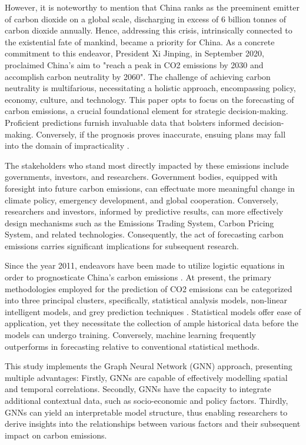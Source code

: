 \documentclass[sigconf, authordraft]{acmart}
\begin{document}
However, it is noteworthy to mention that China ranks as the preeminent
emitter of carbon dioxide on a global scale, discharging in excess of 6 billion
tonnes of carbon dioxide annually. Hence, addressing this crisis,
intrinsically connected to the existential fate of mankind, became a priority for
China. As a concrete commitment to this endeavor, President Xi Jinping, in
September 2020, proclaimed China's aim to "reach a peak in CO2 emissions by
2030 and accomplish carbon neutrality by 2060". The challenge of achieving
carbon neutrality is multifarious, necessitating a holistic approach,
encompassing policy, economy, culture, and technology. This paper opts to
focus on the forecasting of carbon emissions, a crucial foundational element for
strategic decision-making. Proficient predictions furnish invaluable data that
bolsters informed decision-making. Conversely, if the prognosis proves
inaccurate, ensuing plans may fall into the domain of impracticality \cite{-forecasting}.

The stakeholders who stand most directly impacted by these emissions include governments,
investors, and researchers. Government bodies, equipped with foresight into future
carbon emissions, can effectuate more meaningful change in climate policy, emergency
development, and global cooperation. Conversely, researchers and investors, informed
by predictive results, can more effectively design mechanisms such as the
Emissions Trading System, Carbon Pricing System, and related technologies. Consequently,
the act of forecasting carbon emissions carries significant implications for
subsequent research.

Since the year 2011, endeavors have been made to utilize logistic equations in
order to prognosticate China's carbon emissions \cite{meng2011-modeling}. At present, the primary methodologies
employed for the prediction of CO2 emissions can be categorized into three principal
clusters, specifically, statistical analysis models, non-linear intelligent
models, and grey prediction techniques \cite{gao2021-novel}. Statistical models offer ease of
application, yet they necessitate the collection of ample historical data before
the models can undergo training. Conversely, machine learning frequently outperforms
in forecasting relative to conventional statistical methods.

This study implements the Graph Neural Network (GNN) approach, presenting
multiple advantages: Firstly, GNNs are capable of effectively modelling
spatial and temporal correlations. Secondly, GNNs have the capacity to
integrate additional contextual data, such as socio-economic and policy factors.
Thirdly, GNNs can yield an interpretable model structure, thus enabling
researchers to derive insights into the relationships between various factors
and their subsequent impact on carbon emissions\cite{alam2021-forecasting}.
\end{document}
